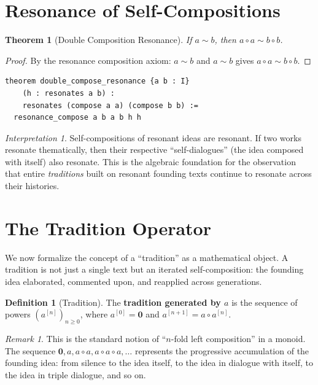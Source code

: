 \documentclass[11pt,openany]{book}
\theoremstyle{definition}
\newtheorem{definition}[axiom]{Definition}
\theoremstyle{plain}
\newtheorem{theorem}[axiom]{Theorem}
\theoremstyle{remark}
\newtheorem{remark}[axiom]{Remark}
\newtheorem{interpretation}[axiom]{Interpretation}
\newcommand{\compose}{\circ}                 %
\newcommand{\void}{\mathbf{0}}              %
\newcommand{\res}{\sim}                      %
\begin{document}
\section{Resonance of Self-Compositions}

\begin{theorem}[Double Composition Resonance]
If $a \res b$, then $a \compose a \res b \compose b$.
\end{theorem}

\begin{proof}
By the resonance composition axiom: $a \res b$ and $a \res b$ gives $a \compose a \res b \compose b$.
\end{proof}

\begin{lstlisting}[language=Lean4]
theorem double_compose_resonance {a b : I}
    (h : resonates a b) :
    resonates (compose a a) (compose b b) :=
  resonance_compose a b a b h h
\end{lstlisting}

\begin{interpretation}
Self-compositions of resonant ideas are resonant. If two works resonate thematically, then their respective ``self-dialogues'' (the idea composed with itself) also resonate. This is the algebraic foundation for the observation that entire \emph{traditions} built on resonant founding texts continue to resonate across their histories.
\end{interpretation}

\section{The Tradition Operator}

We now formalize the concept of a ``tradition'' as a mathematical object. A tradition is not just a single text but an iterated self-composition: the founding idea elaborated, commented upon, and reapplied across generations.

\begin{definition}[Tradition]
The \textbf{tradition generated by $a$} is the sequence of powers $(a^{[n]})_{n \geq 0}$, where $a^{[0]} = \void$ and $a^{[n+1]} = a \compose a^{[n]}$.
\end{definition}

\begin{remark}
This is the standard notion of ``$n$-fold left composition'' in a monoid. The sequence $\void, a, a \compose a, a \compose a \compose a, \ldots$ represents the progressive accumulation of the founding idea: from silence to the idea itself, to the idea in dialogue with itself, to the idea in triple dialogue, and so on.
\end{remark}
\end{document}
